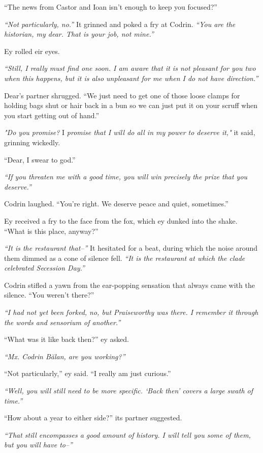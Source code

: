 ``The news from Castor and Ioan isn't enough to keep you focused?''

\emph{``Not particularly, no.''} It grinned and poked a fry at Codrin. \emph{``You are the historian, my dear. That is your job, not mine.''}

Ey rolled eir eyes.

\emph{``Still, I really must find one soon. I am aware that it is not pleasant for you two when this happens, but it is also unpleasant for me when I do not have direction.''}

Dear's partner shrugged. ``We just need to get one of those loose clamps for holding bags shut or hair back in a bun so we can just put it on your scruff when you start getting out of hand.''

\emph{"Do you promise?} I \emph{promise that I will do all in my power to deserve it,"} it said, grinning wickedly.

``Dear, I swear to god.''

\emph{``If you threaten me with a good time, you will win precisely the prize that you deserve.''}

Codrin laughed. ``You're right. We deserve peace and quiet, sometimes.''

Ey received a fry to the face from the fox, which ey dunked into the shake. ``What is this place, anyway?''

\emph{``It is the restaurant that--''} It hesitated for a beat, during which the noise around them dimmed as a cone of silence fell. \emph{``It is the restaurant at which the clade celebrated Secession Day.''}

Codrin stifled a yawn from the ear-popping sensation that always came with the silence. ``You weren't there?''

\emph{``I had not yet been forked, no, but Praiseworthy was there. I remember it through the words and sensorium of another.''}

``What was it like back then?'' ey asked.

\emph{``Mx. Codrin Bălan, are you working?''}

``Not particularly,'' ey said. ``I really am just curious.''

\emph{``Well, you will still need to be more specific. `Back then' covers a large swath of time.''}

``How about a year to either side?'' its partner suggested.

\emph{``That still encompasses a good amount of history. I will tell you some of them, but you will have to--''}

